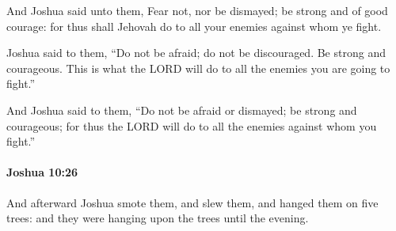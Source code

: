 			\begin{versebox}
					\item[BHS] 
					\item[ASV] And Joshua said unto them, Fear not, nor be dismayed; be strong and of good courage: for thus shall Jehovah do to all your enemies against whom ye fight.
					\item[NIV] Joshua said to them, “Do not be afraid; do not be discouraged. Be strong and courageous. This is what the LORD will do to all the enemies you are going to fight.”
					\item[NRSV] And Joshua said to them, “Do not be afraid or dismayed; be strong and courageous; for thus the LORD will do to all the enemies against whom you fight.”
			\end{versebox}

		\paragraph{Joshua 10:26} %
			\label{JOSHUA-10-26}

			And afterward Joshua smote them, and slew them, and hanged them on five trees: and they were hanging upon the trees until the evening.

